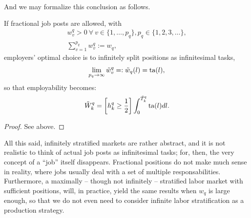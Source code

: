 \documentclass[hidelinks, nonatbib]{elsarticle}
\begin{document}
And we may formalize this conclusion as follows.
\begin{lemma}
    \label{isl}
    If fractional job posts are allowed, with
    \begin{gather}
        w_{v}^{q} 
        > 0
        \
        \forall
        \
        v \in \{1, \dots, p_q\}
        ,
        p_q \in \{1, 2, 3, \dots\}
        ,
        \\
        \sum_{v=1}^{p_q}
        w_{v}^{q}
        :=
        w_q
        ,
        \end{gather}
        employers' optimal choice is to infinitely split positions as infinitesimal tasks,
        \begin{gather}
            \lim_{p_q \rightarrow \infty}{
                \tilde{w}_{v}^{q}
            }
            =:
            \tilde{w}_{q}(l)
            =
            \text{ta}(l)
            ,
            \end{gather}
            so that employability becomes:
            \begin{gather}
                \tilde{W}_{k}^{q} 
                = 
                \left[
                    h_{k}^{q}
                    \geq
                    \frac{1}{2}
                \right]
                \int_{0}^{\tilde{T}_{k}^{q}}
                \text{ta}(l)
                dl
                .
                \end{gather}
    \begin{proof}
        See above.
    \end{proof}
\end{lemma}

All this said, infinitely stratified markets are rather abstract, and it is not realistic to think of actual job posts as infinitesimal tasks; for, then, the very concept of a ``job'' itself disappears. Fractional positions do not make much sense in reality, where jobs usually deal with a set of multiple responsabilities. Furthermore, a maximally -- though not infinitely -- stratified labor market with sufficient positions, will, in practice, yield the same results when $w_q$ is large enough, so that we do not even need to consider infinite labor stratification as a production strategy.
\end{document}
